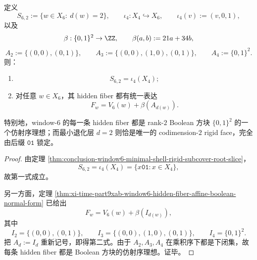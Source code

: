\begin{theorem}\label{thm:conclusion-window6-hidden-fiber-rigid-ideal-normal-form}
定义
\[
S_{6,2}:=\{w\in X_6:\ d(w)=2\},
\qquad
\iota_4:X_4\hookrightarrow X_6,
\qquad
\iota_4(v):=(v,0,1),
\]
以及
\[
\beta:\{0,1\}^2\to \ZZ,
\qquad
\beta(a,b):=21a+34b,
\]
\[
A_2:=\{(0,0),(0,1)\},
\qquad
A_3:=\{(0,0),(1,0),(0,1)\},
\qquad
A_4:=\{0,1\}^2.
\]
则：
\begin{enumerate}
  \item
  \[
  S_{6,2}=\iota_4(X_4);
  \]
  \item 对任意 \(w\in X_6\)，其 hidden fiber 都有统一表达
  \[
  F_w=V_6(w)+\beta(A_{d(w)}).
  \]
\end{enumerate}
特别地，window-\(6\) 的每一条 hidden fiber 都是 rank-\(2\) Boolean 方块 \(\{0,1\}^2\) 的一个仿射序理想；而最小退化层 \(d=2\) 则恰是唯一的 codimension-\(2\) rigid face，完全由后缀 \(\mathtt{01}\) 锁定。
\end{theorem}
\begin{proof}
由定理 \ref{thm:conclusion-window6-minimal-shell-rigid-subcover-root-slice}，
\[
S_{6,2}=\iota_4(X_4)=\{x\mathtt{01}:x\in X_4\},
\]
故第一式成立。

另一方面，定理 \ref{thm:xi-time-part9xab-window6-hidden-fiber-affine-boolean-normal-form} 已给出
\[
F_w=V_6(w)+\beta(I_{d(w)}),
\]
其中
\[
I_2=\{(0,0),(0,1)\},\qquad
I_3=\{(0,0),(1,0),(0,1)\},\qquad
I_4=\{0,1\}^2.
\]
把 \(A_d:=I_d\) 重新记号，即得第二式。由于 \(A_2,A_3,A_4\) 在乘积序下都是下闭集，故每条 hidden fiber 都是 Boolean 方块的仿射序理想。证毕。
\end{proof}

